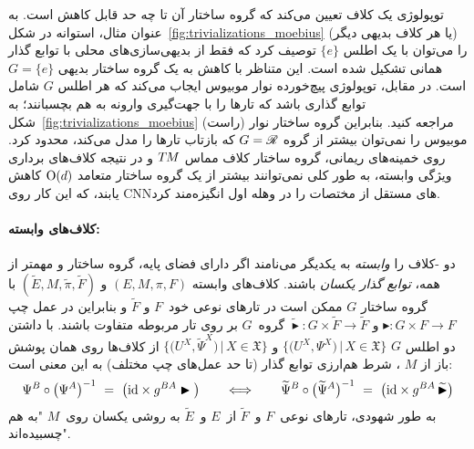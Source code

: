 توپولوژی یک کلاف تعیین می‌کند که گروه ساختار آن تا چه حد قابل کاهش است.
به عنوان مثال، استوانه در شکل~\ref{fig:trivializations_moebius} (یا هر کلاف بدیهی دیگر) را می‌توان با یک اطلس $\{e\}$ توصیف کرد که فقط از بدیهی‌سازی‌های محلی با توابع گذار همانی تشکیل شده است.
این متناظر با کاهش به یک گروه ساختار بدیهی $G=\{e\}$ است.
در مقابل، توپولوژی پیچ‌خورده نوار موبیوس ایجاب می‌کند که هر اطلس $G$ شامل توابع گذاری باشد که تارها را با جهت‌گیری وارونه به هم بچسبانند؛ به شکل~\ref{fig:trivializations_moebius} (راست) مراجعه کنید.
بنابراین گروه ساختار نوار موبیوس را نمی‌توان بیشتر از گروه $G=\mathscr{R}$ که بازتاب تارها را مدل می‌کند، محدود کرد.
روی خمینه‌های ریمانی، گروه ساختار کلاف مماس $T\mkern-1.5muM$ و در نتیجه کلاف‌های برداری ویژگی وابسته، به طور کلی نمی‌توانند بیشتر از یک گروه ساختار متعامد $\operatorname{O}(d)$ کاهش یابند، که این کار روی CNNهای مستقل از مختصات را در وهله اول انگیزه‌مند کرد.

\paragraph{کلاف‌های  وابسته:}
دو -کلاف را \emph{وابسته} به یکدیگر می‌نامند اگر دارای فضای پایه، گروه ساختار و مهمتر از همه، \emph{توابع گذار یکسان} باشند.
کلاف‌های وابسته $(E,M,\pi,F)$ و $(\widetilde{E},M,\widetilde{\pi},\widetilde{F})$ با گروه ساختار $G$ ممکن است در تارهای نوعی خود~$F$ و $\widetilde{F}$ و بنابراین در عمل چپ $\blacktriangleright: G \times F\to F$ و $\widetilde{\blacktriangleright}: G \times \widetilde{F}\to \widetilde{F}$ گروه~$G$ بر روی تار مربوطه متفاوت باشند.
با داشتن دو اطلس $G$
$\big\{\big( U^X,              \Psi^X  \big) \,\big|\, X\in\mathfrak{X} \big\}$ و
$\big\{\big( U^X, \widetilde{\Psi}^X \big) \,\big|\, X\in\mathfrak{X} \big\}$
از کلاف‌ها روی همان پوشش باز از $M$ ، شرط هم‌ارزی توابع گذار (تا حد عمل‌های چپ مختلف) به این معنی است:
\begin{align}
	\Psi^B \circ \big(\Psi^A \big)^{-1}\ =\ \big(\id \times g^{BA}\blacktriangleright \big)
	\qquad \Longleftrightarrow \qquad
	\widetilde{\Psi}^B \circ \big(\widetilde{\Psi}^A \big)^{-1}\ =\ \big(\id \times g^{BA}\, \widetilde{\blacktriangleright} \big)
\end{align}
به طور شهودی، تارهای نوعی~$F$ و~$\widetilde{F}$ از~$E$ و~$\widetilde{E}$ به روشی یکسان روی~$M$ "به هم چسبیده‌اند".

